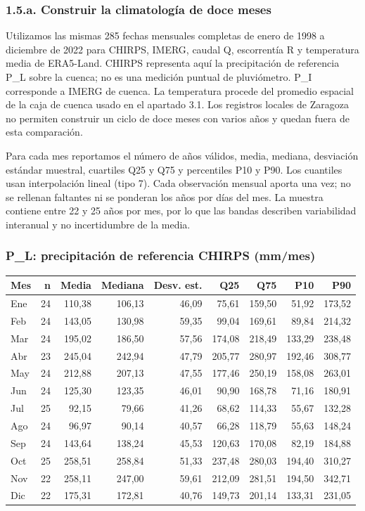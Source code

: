\documentclass[10pt,a4paper]{article}
\begin{document}
\subsubsection*{1.5.a. Construir la climatología de doce meses}
Utilizamos las mismas 285 fechas mensuales completas de enero de 1998 a diciembre de 2022 para CHIRPS, IMERG, caudal Q, escorrentía R y temperatura media de ERA5-Land. CHIRPS representa aquí la precipitación de referencia P\_L sobre la cuenca; no es una medición puntual de pluviómetro. P\_I corresponde a IMERG de cuenca. La temperatura procede del promedio espacial de la caja de cuenca usado en el apartado 3.1. Los registros locales de Zaragoza no permiten construir un ciclo de doce meses con varios años y quedan fuera de esta comparación.

Para cada mes reportamos el número de años válidos, media, mediana, desviación estándar muestral, cuartiles Q25 y Q75 y percentiles P10 y P90. Los cuantiles usan interpolación lineal (tipo 7). Cada observación mensual aporta una vez; no se rellenan faltantes ni se ponderan los años por días del mes. La muestra contiene entre 22 y 25 años por mes, por lo que las bandas describen variabilidad interanual y no incertidumbre de la media.

\subsubsection*{P\_L: precipitación de referencia CHIRPS (mm/mes)}
\begin{center}\small\begin{tabular}{lrrrrrrrr}\hline
Mes & n & Media & Mediana & Desv. est. & Q25 & Q75 & P10 & P90 \\\hline
Ene & 24 & 110,38 & 106,13 & 46,09 & 75,61 & 159,50 & 51,92 & 173,52\\
Feb & 24 & 143,05 & 130,98 & 59,35 & 99,04 & 169,61 & 89,84 & 214,32\\
Mar & 24 & 195,02 & 186,50 & 57,56 & 174,08 & 218,49 & 133,29 & 238,48\\
Abr & 23 & 245,04 & 242,94 & 47,79 & 205,77 & 280,97 & 192,46 & 308,77\\
May & 24 & 212,88 & 207,13 & 47,55 & 177,46 & 250,19 & 158,08 & 263,01\\
Jun & 24 & 125,30 & 123,35 & 46,01 & 90,90 & 168,78 & 71,16 & 180,91\\
Jul & 25 & 92,15 & 79,66 & 41,26 & 68,62 & 114,33 & 55,67 & 132,28\\
Ago & 24 & 96,97 & 90,14 & 40,57 & 66,28 & 118,79 & 55,63 & 148,24\\
Sep & 24 & 143,64 & 138,24 & 45,53 & 120,63 & 170,08 & 82,19 & 184,88\\
Oct & 25 & 258,51 & 258,84 & 51,33 & 237,48 & 280,03 & 194,40 & 310,27\\
Nov & 22 & 258,11 & 247,00 & 59,61 & 212,09 & 281,51 & 194,50 & 342,71\\
Dic & 22 & 175,31 & 172,81 & 40,76 & 149,73 & 201,14 & 133,31 & 231,05\\
\hline\end{tabular}\end{center}
\end{document}

